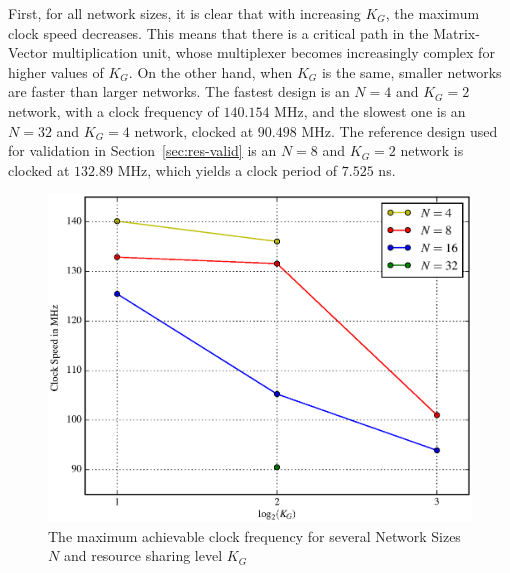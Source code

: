 First, for all network sizes, it is clear that with increasing $K_G$, the maximum clock speed decreases. This means that there is a critical path in the Matrix-Vector multiplication unit, whose multiplexer becomes increasingly complex for higher values of $K_G$. On the other hand, when $K_G$ is the same, smaller networks are faster than larger networks. The fastest design is an $N=4$ and $K_G = 2$ network, with a clock frequency of $140.154$ MHz, and the slowest one is an $N=32$ and $K_G=4$ network, clocked at $90.498$ MHz. The reference design used for validation in Section~\ref{sec:res-valid} is an $N=8$ and $K_G=2$ network is clocked at $132.89$ MHz, which yields a clock period of $7.525$ ns.

\begin{figure}
    \centering
    \includegraphics[width=\linewidth]{figures/maxfreq.eps}
    \caption[The maximum achievable clock frequency for several Network Sizes $N$ and resource sharing level $K_G$]{The maximum achievable clock frequency for several Network Sizes $N$ and resource sharing level $K_G$}
    \label{fig:maxfreq}
\end{figure}


